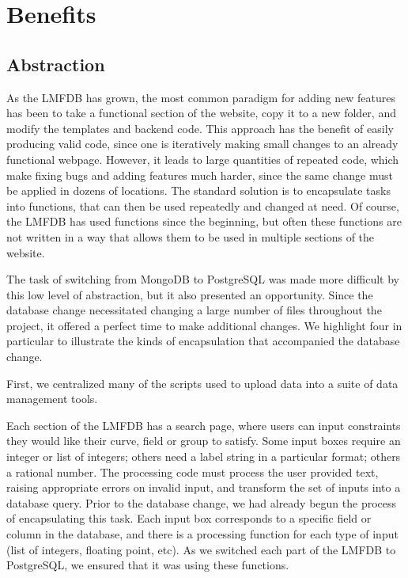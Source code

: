 \documentclass{article}
\begin{document}
\section{Benefits}

\subsection{Abstraction}

As the LMFDB has grown, the most common paradigm for adding new features has been to take a functional section of the website, copy it to a new folder, and modify the templates and backend code.
This approach has the benefit of easily producing valid code, since one is iteratively making small changes to an already functional webpage.
However, it leads to large quantities of repeated code, which make fixing bugs and adding features much harder, since the same change must be applied in dozens of locations.
The standard solution is to encapsulate tasks into functions, that can then be used repeatedly and changed at need.
Of course, the LMFDB has used functions since the beginning, but often these functions are not written in a way that allows them to be used in multiple sections of the website.

The task of switching from MongoDB to PostgreSQL was made more difficult by this low level of abstraction, but it also presented an opportunity.
Since the database change necessitated changing a large number of files throughout the project, it offered a perfect time to make additional changes.
We highlight four in particular to illustrate the kinds of encapsulation that accompanied the database change.

First, we centralized many of the scripts used to upload data into a suite of data management tools. 

Each section of the LMFDB has a search page, where users can input constraints they would like their curve, field or group to satisfy.
Some input boxes require an integer or list of integers; others need a label string in a particular format; others a rational number.
The processing code must process the user provided text, raising appropriate errors on invalid input, and transform the set of inputs into a database query.
Prior to the database change, we had already begun the process of encapsulating this task.
Each input box corresponds to a specific field or column in the database, and there is a processing function for each type of input (list of integers, floating point, etc).
As we switched each part of the LMFDB to PostgreSQL, we ensured that it was using these functions.
\end{document}
